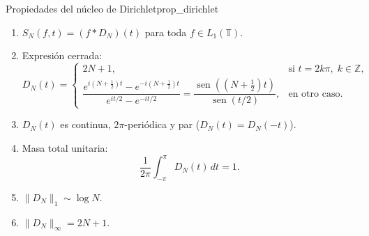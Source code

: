 \begin{proposicion}{Propiedades del núcleo de Dirichlet}{prop_dirichlet}
\begin{enumerate}
    \item $S_N(f, t) = (f * D_N)(t)$ para toda $f \in L_1(\mathbb{T})$.
    \item Expresión cerrada:
    \[
    D_N(t) = \begin{cases}
    2N + 1, & \text{si } t = 2k\pi, \; k \in \mathbb{Z}, \\[1ex]
    \dfrac{e^{i\left(N + \frac{1}{2}\right)t} - e^{-i\left(N + \frac{1}{2}\right)t}}{e^{i t/2} - e^{-i t/2}} = \dfrac{\operatorname{sen}\left(\left(N + \frac{1}{2}\right)t\right)}{\operatorname{sen}(t/2)}, & \text{en otro caso.}
    \end{cases}
    \]
    \item $D_N(t)$ es continua, $2\pi$-periódica y par ($D_N(t) = D_N(-t)$).
    \item Masa total unitaria:
    \[
    \frac{1}{2\pi} \int_{-\pi}^\pi D_N(t) \, dt = 1.
    \]
    \item $\|D_N\|_1 \sim \log N$.
    \item $\|D_N\|_\infty = 2N + 1$.
\end{enumerate}
\end{proposicion}

